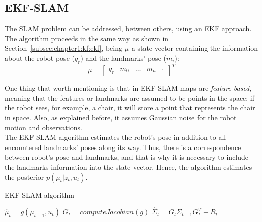 \subsection{EKF-SLAM}
\label{subsec:chapter1:slam:ekfslam}
The SLAM problem can be addressed, between others, using an EKF approach. The algorithm proceeds in the same way as shown in Section~\ref{subsec:chapter1:kf:ekf}, being $\mu$ a state vector containing the information about the robot pose ($q_r$) and the landmarks' pose ($m_i$):
\begin{equation}
    \mu = \begin{bmatrix}
        q_r & m_0 & \dots & m_{n-1}
    \end{bmatrix}^T
\end{equation}

One thing that worth mentioning is that in EKF-SLAM maps are \emph{feature based}, meaning that the features or landmarks are assumed to be points in the space: if the robot sees, for example, a chair, it will store a point that represents the chair in space. Also, as explained before, it assumes Gaussian noise for the robot motion and observations.\\

The EKF-SLAM algorithm estimates the robot's pose in addition to all encountered landmarks' poses along its way. Thus, there is a correspondence between robot's pose and landmarks, and that is why it is necessary to include the landmarks information into the state vector. Hence, the algorithm estimates the posterior $p\left(\mu_t | z_t, u_t\right)$.\\

\begin{algorithm}[h]
    \caption{EKF-SLAM algorithm}
    \label{alg:chapter1:slam:ekfslam}
    \BlankLine
    \BlankLine
    $\hat\mu_t = g\left(\mu_{t-1}, u_t\right)$\;
    $G_t = computeJacobian\left(g\right)$\;
    $\hat\Sigma_t = G_t \Sigma_{t-1} G_t^T + R_t$\;
    \BlankLine
    \BlankLine
\end{algorithm}

